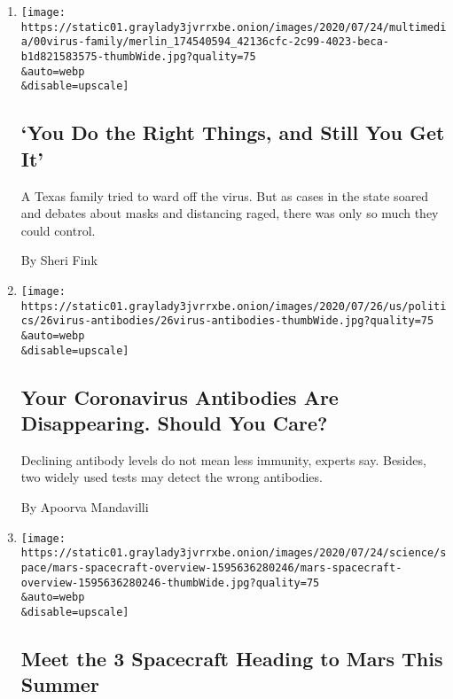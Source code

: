 \begin{enumerate}
\def\labelenumi{\arabic{enumi}.}
\item
  \href{/2020/07/26/us/coronavirus-family-houston-masks.html}{}

  \texttt{[image: https://static01.graylady3jvrrxbe.onion/images/2020/07/24/multimedia/00virus-family/merlin\_174540594\_42136cfc-2c99-4023-beca-b1d821583575-thumbWide.jpg?quality=75\\\&auto=webp\\\&disable=upscale]}

  \hypertarget{you-do-the-right-things-and-still-you-get-it}{%
  \subsection{`You Do the Right Things, and Still You Get
  It'}\label{you-do-the-right-things-and-still-you-get-it}}

  A Texas family tried to ward off the virus. But as cases in the state
  soared and debates about masks and distancing raged, there was only so
  much they could control.

  By Sheri Fink
\item
  \href{/2020/07/26/health/coronvirus-antibody-tests.html}{}

  \texttt{[image: https://static01.graylady3jvrrxbe.onion/images/2020/07/26/us/politics/26virus-antibodies/26virus-antibodies-thumbWide.jpg?quality=75\\\&auto=webp\\\&disable=upscale]}

  \hypertarget{your-coronavirus-antibodies-are-disappearing-should-you-care}{%
  \subsection{Your Coronavirus Antibodies Are Disappearing. Should You
  Care?}\label{your-coronavirus-antibodies-are-disappearing-should-you-care}}

  Declining antibody levels do not mean less immunity, experts say.
  Besides, two widely used tests may detect the wrong antibodies.

  By Apoorva Mandavilli
\item
  \href{/interactive/2020/science/mars-perseverance-tianwen-hope.html}{}

  \texttt{[image: https://static01.graylady3jvrrxbe.onion/images/2020/07/24/science/space/mars-spacecraft-overview-1595636280246/mars-spacecraft-overview-1595636280246-thumbWide.jpg?quality=75\\\&auto=webp\\\&disable=upscale]}

  \hypertarget{meet-the-3-spacecraft-heading-to-mars-this-summer}{%
  \subsection{Meet the 3 Spacecraft Heading to Mars This
  Summer}\label{meet-the-3-spacecraft-heading-to-mars-this-summer}}


\end{enumerate}
